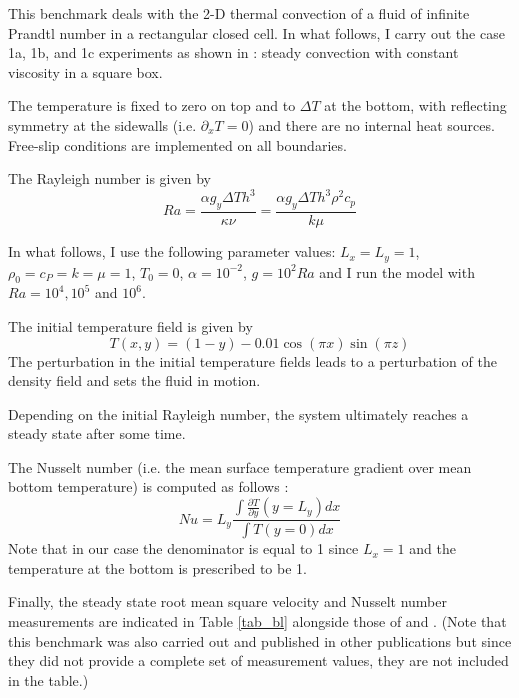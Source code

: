 
This benchmark deals with the 2-D thermal convection of a fluid 
of infinite Prandtl number in a rectangular closed cell.
In what follows, I carry out the case 1a, 1b, and 1c experiments as shown in \cite{blbc89}:
steady convection with constant viscosity in a square box.

The temperature is fixed to zero on top and to $\Delta T$ at the bottom, 
with reflecting symmetry at the sidewalls (i.e. $\partial_x T=0$) 
and there are no internal heat sources. 
Free-slip conditions are implemented on all boundaries. 

The Rayleigh number is given by
\begin{equation}
Ra = \frac{\alpha g_y \Delta T h^3 }{\kappa \nu}
=\frac{\alpha g_y \Delta T h^3 \rho^2 c_p}{k \mu}
\end{equation}

In what follows, I use the following parameter values:  %
$L_x=L_y=1$,$\rho_0=c_P=k=\mu=1$, $T_0=0$, $\alpha=10^{-2}$, $g=10^{2}Ra$
and I run the model with $Ra=10^4,10^{5}$ and $10^6$.

The initial temperature field is given by 
\begin{equation}
T(x,y)=(1-y) - 0.01\cos(\pi x) \sin(\pi z)
\end{equation}
The perturbation in the initial temperature fields leads to 
a perturbation of the density field and sets the fluid in motion. 

Depending on the initial Rayleigh number, the system ultimately reaches a 
steady state after some time. 

The Nusselt number (i.e. the mean surface temperature gradient over mean bottom temperature)
is computed as follows \cite{blbc89}:
\begin{equation}
Nu = L_y \frac{\int \frac{\partial T}{\partial y}(y=L_y) dx  }{\int T(y=0) dx}
\label{eqNu}
\end{equation}
Note that in our case the denominator is equal to 1 since $L_x=1$ and the temperature at the 
bottom is prescribed to be 1.

Finally, the steady state root mean square velocity and Nusselt number measurements
are indicated in Table \ref{tab_bl} alongside those of \cite{blbc89} and \cite{tack94}.
(Note that this benchmark was also carried out and published in  
other publications \cite{trha98,albe00,gery10,dawk11,lezh11} but since they did not provide  a complete set
of measurement values, they are not included in the table.)

